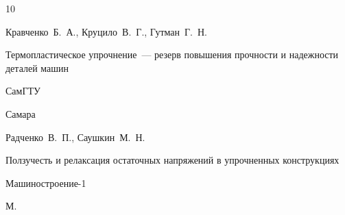 \begin{thebibliography}{10}








\by Кравченко~Б.~А., Круцило~В.~Г., Гутман~Г.~Н.

\book Термопластическое упрочнение~--- резерв повышения прочности и надежности деталей машин



\publ СамГТУ

\publaddr Самара
















\by Радченко~В.~П., Саушкин~М.~Н.

\book Ползучесть и релаксация остаточных напряжений в упрочненных конструкциях



\publ Машиностроение-1

\publaddr М.








\end{thebibliography}

